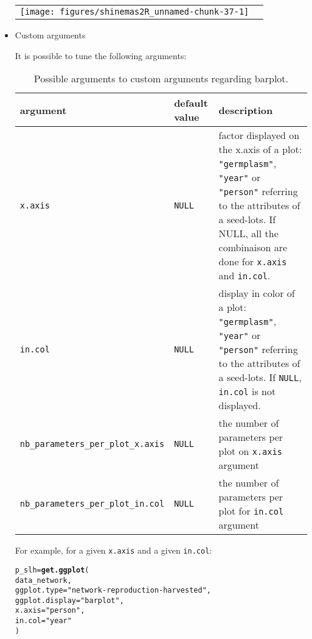 \documentclass{article}\usepackage[]{graphicx}\usepackage[]{color}
\makeatletter
\newcommand{\hlstr}[1]{\textcolor[rgb]{0.192,0.494,0.8}{#1}}%
\newcommand{\hlstd}[1]{\textcolor[rgb]{0.345,0.345,0.345}{#1}}%
\newcommand{\hlkwb}[1]{\textcolor[rgb]{0.69,0.353,0.396}{#1}}%
\newcommand{\hlkwc}[1]{\textcolor[rgb]{0.333,0.667,0.333}{#1}}%
\newcommand{\hlkwd}[1]{\textcolor[rgb]{0.737,0.353,0.396}{\textbf{#1}}}%
\newenvironment{kframe}{%
 \def\at@end@of@kframe{}%
 \ifinner\ifhmode%
  \def\at@end@of@kframe{\end{minipage}}%
  \begin{minipage}{\columnwidth}%
 \fi\fi%
 \def\FrameCommand##1{\hskip\@totalleftmargin \hskip-\fboxsep
 \colorbox{shadecolor}{##1}\hskip-\fboxsep
     \hskip-\linewidth \hskip-\@totalleftmargin \hskip\columnwidth}%
 \MakeFramed {\advance\hsize-\width
   \@totalleftmargin\z@ \linewidth\hsize
   \@setminipage}}%
 {\par\unskip\endMakeFramed%
 \at@end@of@kframe}
\newenvironment{knitrout}{}{} %
\makeatother
\begin{document}
\begin{itemize}
\begin{center}
\begin{tabular}{cc}
\begin{knitrout}
{\centering \texttt{[image: figures/shinemas2R\_unnamed-chunk-37-1]} 

}



\end{knitrout}
\\
\end{tabular}
\end{center}

\item Custom arguments

It is possible to tune the following arguments:

\begin{center}
\begin{table}[H]
\begin{tabular}{ p{} p{} p{} }
\hline
argument & default value & description \\
\hline

\texttt{x.axis} & \texttt{NULL} & factor displayed on the x.axis of a plot: \texttt{"germplasm"}, \texttt{"year"} or \texttt{"person"} referring to the attributes of a seed-lots. If NULL, all the combinaison are done for \texttt{x.axis} and \texttt{in.col}. \\
\hline

\texttt{in.col} & \texttt{NULL} & display in color of a plot: \texttt{"germplasm"}, \texttt{"year"} or \texttt{"person"} referring to the attributes of a seed-lots. If \texttt{NULL}, \texttt{in.col} is not displayed. \\
\hline

\texttt{nb\_parameters\_per\_plot\_x.axis} & \texttt{NULL} & the number of parameters per plot on \texttt{x.axis} argument \\
\hline

\texttt{nb\_parameters\_per\_plot\_in.col} & \texttt{NULL} & the number of parameters per plot for \texttt{in.col} argument \\

\hline
\end{tabular}
\caption{Possible arguments to custom arguments regarding barplot.}
\label{custom.barplot}
\end{table}
\end{center}



For example, for a given \texttt{x.axis} and a given \texttt{in.col}:
\begin{knitrout}
\color{fgcolor}\begin{kframe}
\begin{alltt}
\hlstd{p_slh} \hlkwb{=} \hlkwd{get.ggplot}\hlstd{(}
        \hlstd{data_network,}
        \hlkwc{ggplot.type} \hlstd{=} \hlstr{"network-reproduction-harvested"}\hlstd{,}
        \hlkwc{ggplot.display} \hlstd{=} \hlstr{"barplot"}\hlstd{,}
        \hlkwc{x.axis} \hlstd{=} \hlstr{"person"}\hlstd{,}
        \hlkwc{in.col} \hlstd{=} \hlstr{"year"}
        \hlstd{)}
\end{alltt}
\end{kframe}
\end{knitrout}


\end{itemize}
\end{document}

